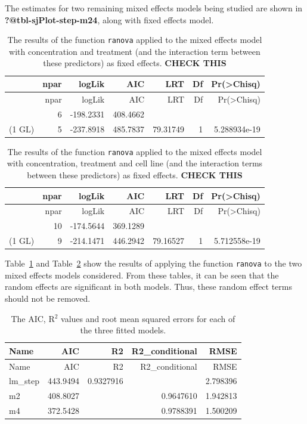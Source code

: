 \documentclass[
  letterpaper,
  DIV=11,
  numbers=noendperiod]{scrartcl}
\begin{document}
The estimates for two remaining mixed effects models being studied are
shown in \textbf{?@tbl-sjPlot-step-m24}, along with fixed effects model.

\hypertarget{tbl-ranova-m2}{}
\begin{longtable}[]{@{}lrrrrrr@{}}
\caption{\label{tbl-ranova-m2}The results of the function
\texttt{ranova} applied to the mixed effects model with concentration
and treatment (and the interaction term between these predictors) as
fixed effects. \textbf{CHECK THIS}}\tabularnewline
\toprule()
& npar & logLik & AIC & LRT & Df & Pr(\textgreater Chisq) \\
\midrule()
\endfirsthead
\toprule()
& npar & logLik & AIC & LRT & Df & Pr(\textgreater Chisq) \\
\midrule()
\endhead
& 6 & -198.2331 & 408.4662 & & & \\
(1 \textbar{} GL) & 5 & -237.8918 & 485.7837 & 79.31749 & 1 &
5.288934e-19 \\
\bottomrule()
\end{longtable}

\hypertarget{tbl-ranova-m4}{}
\begin{longtable}[]{@{}lrrrrrr@{}}
\caption{\label{tbl-ranova-m4}The results of the function
\texttt{ranova} applied to the mixed effects model with concentration,
treatment and cell line (and the interaction terms between these
predictors) as fixed effects. \textbf{CHECK THIS}}\tabularnewline
\toprule()
& npar & logLik & AIC & LRT & Df & Pr(\textgreater Chisq) \\
\midrule()
\endfirsthead
\toprule()
& npar & logLik & AIC & LRT & Df & Pr(\textgreater Chisq) \\
\midrule()
\endhead
& 10 & -174.5644 & 369.1289 & & & \\
(1 \textbar{} GL) & 9 & -214.1471 & 446.2942 & 79.16527 & 1 &
5.712558e-19 \\
\bottomrule()
\end{longtable}

Table~\ref{tbl-ranova-m2} and Table~\ref{tbl-ranova-m4} show the results
of applying the function \texttt{ranova} to the two mixed effects models
considered. From these tables, it can be seen that the random effects
are significant in both models. Thus, these random effect terms should
not be removed.

\hypertarget{tbl-performance-m234}{}
\begin{longtable}[]{@{}lrrrr@{}}
\caption{\label{tbl-performance-m234}The AIC, R\(^{2}\) values and root
mean squared errors for each of the three fitted models.}\tabularnewline
\toprule()
Name & AIC & R2 & R2\_conditional & RMSE \\
\midrule()
\endfirsthead
\toprule()
Name & AIC & R2 & R2\_conditional & RMSE \\
\midrule()
\endhead
lm\_step & 443.9494 & 0.9327916 & & 2.798396 \\
m2 & 408.8027 & & 0.9647610 & 1.942813 \\
m4 & 372.5428 & & 0.9788391 & 1.500209 \\
\bottomrule()
\end{longtable}
\end{document}

